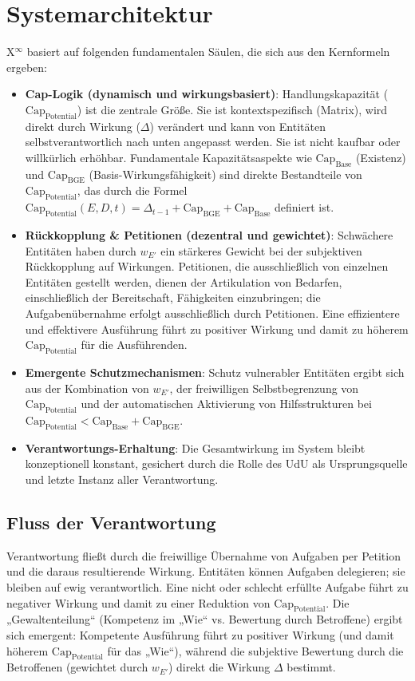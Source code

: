 \documentclass[12pt]{scrartcl}
\begin{document}
\section{Systemarchitektur}
X$^\infty$ basiert auf folgenden fundamentalen Säulen, die sich aus den Kernformeln ergeben:
\begin{itemize}
    \item \textbf{Cap-Logik (dynamisch und wirkungsbasiert)}: Handlungskapazität ($\text{Cap}_{\text{Potential}}$) ist die zentrale Größe. Sie ist kontextspezifisch (Matrix), wird direkt durch Wirkung ($\Delta$) verändert und kann von Entitäten selbstverantwortlich nach unten angepasst werden. Sie ist nicht kaufbar oder willkürlich erhöhbar. Fundamentale Kapazitätsaspekte wie $\text{Cap}_{\text{Base}}$ (Existenz) und $\text{Cap}_{\text{BGE}}$ (Basis-Wirkungsfähigkeit) sind direkte Bestandteile von $\text{Cap}_{\text{Potential}}$, das durch die Formel $\text{Cap}_{\text{Potential}}(E,D,t) = \Delta_{t-1} + \text{Cap}_{\text{BGE}} + \text{Cap}_{\text{Base}}$ definiert ist.
    \item \textbf{Rückkopplung \& Petitionen (dezentral und gewichtet)}: Schwächere Entitäten haben durch $w_{E'}$ ein stärkeres Gewicht bei der subjektiven Rückkopplung auf Wirkungen. Petitionen, die ausschließlich von einzelnen Entitäten gestellt werden, dienen der Artikulation von Bedarfen, einschließlich der Bereitschaft, Fähigkeiten einzubringen; die Aufgabenübernahme erfolgt ausschließlich durch Petitionen. Eine effizientere und effektivere Ausführung führt zu positiver Wirkung und damit zu höherem $\text{Cap}_{\text{Potential}}$ für die Ausführenden.
    \item \textbf{Emergente Schutzmechanismen}: Schutz vulnerabler Entitäten ergibt sich aus der Kombination von $w_{E'}$, der freiwilligen Selbstbegrenzung von $\text{Cap}_{\text{Potential}}$ und der automatischen Aktivierung von Hilfsstrukturen bei $\text{Cap}_{\text{Potential}} < \text{Cap}_{\text{Base}} + \text{Cap}_{\text{BGE}}$.
    \item \textbf{Verantwortungs-Erhaltung}: Die Gesamtwirkung im System bleibt konzeptionell konstant, gesichert durch die Rolle des UdU als Ursprungsquelle und letzte Instanz aller Verantwortung.
\end{itemize}

\subsection{Fluss der Verantwortung}
\label{sec:FlussDerVerantwortung}
Verantwortung fließt durch die freiwillige Übernahme von Aufgaben per Petition und die daraus resultierende Wirkung. Entitäten können Aufgaben delegieren; sie bleiben auf ewig verantwortlich. Eine nicht oder schlecht erfüllte Aufgabe führt zu negativer Wirkung und damit zu einer Reduktion von $\text{Cap}_{\text{Potential}}$. Die „Gewaltenteilung“ (Kompetenz im „Wie“ vs. Bewertung durch Betroffene) ergibt sich emergent: Kompetente Ausführung führt zu positiver Wirkung (und damit höherem $\text{Cap}_{\text{Potential}}$ für das „Wie“), während die subjektive Bewertung durch die Betroffenen (gewichtet durch $w_{E'}$) direkt die Wirkung $\Delta$ bestimmt.
\end{document}
